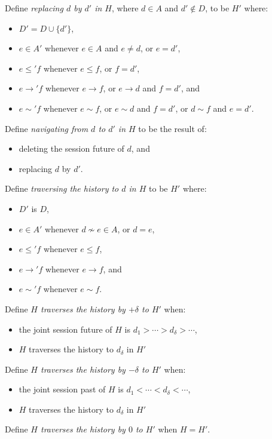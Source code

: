 \documentclass{article}
\newcommand{\aNH}{H}
\newcommand{\Docs}{D}
\newcommand{\Active}{A}
\newcommand{\parentOf}{\rightarrow}
\newcommand{\leChron}{\le}
\newcommand{\ltChron}{<}
\newcommand{\gtChron}{>}
\newcommand{\eqSess}{\sim}
\newcommand{\aDoc}{d}
\newcommand{\bDoc}{e}
\newcommand{\cDoc}{f}
\begin{document}
Define \emph{replacing $\aDoc$ by $\aDoc'$ in $\aNH$}, where $\aDoc\in\Active$ and
$\aDoc'\notin\Docs$, to be $\aNH'$ where:
\begin{itemize}
\item $\Docs' = \Docs \cup \{\aDoc'\}$,
\item $\bDoc \in \Active'$ whenever
  $\bDoc \in \Active$ and $\bDoc\ne\aDoc$, or
  $\bDoc=\aDoc'$,
\item $\bDoc \leChron' \cDoc$ whenever
  $\bDoc \leChron \cDoc$, or $\cDoc = \aDoc'$,
\item $\bDoc \parentOf' \cDoc$ whenever
  $\bDoc \parentOf \cDoc$, or
  $\bDoc \parentOf \aDoc$ and $\cDoc = \aDoc'$, and
\item $\bDoc \eqSess' \cDoc$ whenever
  $\bDoc \eqSess \cDoc$, or
  $\bDoc \eqSess \aDoc$ and $\cDoc = \aDoc'$, or
  $\aDoc \eqSess \cDoc$ and $\bDoc = \aDoc'$.
\end{itemize}
Define \emph{navigating from $\aDoc$ to $\aDoc'$ in $\aNH$} to be the result of:
\begin{itemize}
\item deleting the session future of $\aDoc$, and
\item replacing $\aDoc$ by $\aDoc'$.
\end{itemize}
Define \emph{traversing the history to $\aDoc$ in $\aNH$} to be $\aNH'$ where:
\begin{itemize}
\item $\Docs'$ is $\Docs$,
\item $\bDoc\in\Active'$ whenever $\aDoc\not\eqSess\bDoc \in \Active$, or
  $\aDoc=\bDoc$,
\item $\bDoc\leChron'\cDoc$ whenever $\bDoc\leChron\cDoc$,
\item $\bDoc\parentOf'\cDoc$ whenever $\bDoc\parentOf\cDoc$, and
\item $\bDoc\eqSess'\cDoc$ whenever $\bDoc\eqSess\cDoc$.
\end{itemize}
Define \emph{$\aNH$ traverses the history by $+\delta$ to $\aNH'$} when:
\begin{itemize}
\item the joint session future of $\aNH$ is $\aDoc_1 \gtChron \cdots \gtChron \aDoc_\delta \gtChron \cdots$,
\item $H$ traverses the history to $d_\delta$ in $H'$
\end{itemize}
Define \emph{$\aNH$ traverses the history by $-\delta$ to $\aNH'$} when:
\begin{itemize}
\item the joint session past of $\aNH$ is $\aDoc_1 \ltChron \cdots \ltChron \aDoc_\delta \ltChron \cdots$,
\item $H$ traverses the history to $d_\delta$ in $H'$
\end{itemize}
Define \emph{$\aNH$ traverses the history by $0$ to $\aNH'$} when $\aNH=\aNH'$.
\end{document}
